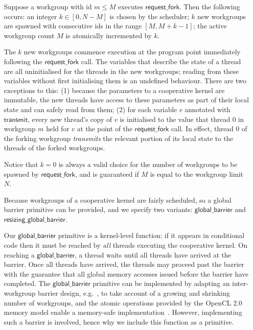 \documentclass[parskip=half,sigconf,review, anonymous=true, acmcopyrightmode=none]{acmart}
\newcommand{\mysec}{Sec.~}
\newcommand{\transmit}{\mathsf{transmit}}
\newcommand{\offerfork}{\mathsf{request\_fork}}
\newcommand{\globalbarrier}{\mathsf{global\_barrier}}
\newcommand{\resizingglobalbarrier}{\mathsf{resizing\_global\_barrier}}
\begin{document}
Suppose a workgroup with id $m\leq M$ executes $\offerfork$.  Then the following occurs: an
integer $k \in [0, N-M]$ is chosen by the scheduler;
$k$ new workgroups are spawned with consecutive ids in the range $[M,
  M+k-1]$; the active workgroup count $M$ is atomically incremented by $k$.

The $k$ new workgroups commence execution at the program point
immediately following the $\offerfork$ call.  The variables that
describe the state of a thread are all uninitialised for the threads
in the new workgroups; reading from these variables without first
initialising them is an undefined behaviour.  There are two exceptions
to this: (1) because the parameters to a cooperative kernel are
immutable, the new threads have access to these parameters as part of
their local state and can safely read from them; (2) for each variable
$v$ annotated with $\transmit$, every new thread's copy of $v$ is
initialised to the value that thread 0 in workgroup $m$ held for $v$
at the point of the $\offerfork$ call.
%
In effect, thread 0 of the forking workgroup \emph{transmits} the relevant
portion of its local state to the threads of the forked workgroups.


Notice that $k=0$ is always a valid choice for the number of
workgroups to be spawned by $\offerfork$, and is guaranteed if $M$
is equal to the workgroup limit $N$.

%
Because workgroups of a cooperative kernel are fairly scheduled, so a
global barrier primitive can be provided, and we specify two variants: $\globalbarrier$
and $\resizingglobalbarrier$.

Our $\globalbarrier$ primitive is a kernel-level function: if it
appears in conditional code then it must be reached by \emph{all}
threads executing the cooperative kernel.  On reaching a
$\globalbarrier$, a thread waits until all threads have arrived at
the barrier.  Once all threads have arrived, the threads may proceed
past the barrier with the guarantee that all global memory accesses
issued before the barrier have completed.  The $\globalbarrier$
primitive can be implemented by adapting an inter-workgroup barrier
design, e.g.~\cite{XF10}, to take account of a growing and shrinking number of workgroups, and the atomic operations provided by
the OpenCL 2.0 memory model enable a memory-safe
implementation~\cite{DBLP:conf/oopsla/SorensenDBGR16}.  However, implementing such a barrier is
involved, hence why we include this function as a primitive.
\end{document}
